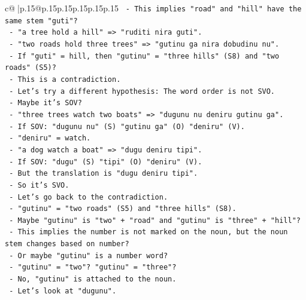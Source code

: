 \documentclass{article}
\begin{document}
{\begin{supertabular}{c@{$\;$}|p{.15\linewidth}@{}p{.15\linewidth}p{.15\linewidth}p{.15\linewidth}p{.15\linewidth}p{.15\linewidth}}
{{{\texttt{                  {-} This implies "road" and "hill" have the same stem "guti"?} \\
\texttt{                  {-} "a tree hold a hill" => "ruditi nira guti".} \\
\texttt{                  {-} "two roads hold three trees" => "gutinu ga nira dobudinu nu".} \\
\texttt{                  {-} If "guti" = hill, then "gutinu" = "three hills" (S8) and "two roads" (S5)?} \\
\texttt{                  {-} This is a contradiction.} \\
\texttt{                  {-} Let's try a different hypothesis: The word order is not SVO.} \\
\texttt{                  {-} Maybe it's SOV?} \\
\texttt{                  {-} "three trees watch two boats" => "dugunu nu deniru gutinu ga".} \\
\texttt{                    {-} If SOV: "dugunu nu" (S) "gutinu ga" (O) "deniru" (V).} \\
\texttt{                    {-} "deniru" = watch.} \\
\texttt{                  {-} "a dog watch a boat" => "dugu deniru tipi".} \\
\texttt{                    {-} If SOV: "dugu" (S) "tipi" (O) "deniru" (V).} \\
\texttt{                    {-} But the translation is "dugu deniru tipi".} \\
\texttt{                    {-} So it's SVO.} \\
\texttt{                  {-} Let's go back to the contradiction.} \\
\texttt{                  {-} "gutinu" = "two roads" (S5) and "three hills" (S8).} \\
\texttt{                  {-} Maybe "gutinu" is "two" + "road" and "gutinu" is "three" + "hill"?} \\
\texttt{                  {-} This implies the number is not marked on the noun, but the noun stem changes based on number?} \\
\texttt{                  {-} Or maybe "gutinu" is a number word?} \\
\texttt{                  {-} "gutinu" = "two"? "gutinu" = "three"?} \\
\texttt{                  {-} No, "gutinu" is attached to the noun.} \\
\texttt{                  {-} Let's look at "dugunu".} \\
}}}
\end{supertabular}}
\end{document}
